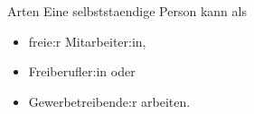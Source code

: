 
\begin{frame}{Arten}
  Eine selbststaendige Person kann als
  \begin{itemize}
  \item freie:r Mitarbeiter:in,
  \item Freiberufler:in oder 
  \item Gewerbetreibende:r arbeiten.
  \end{itemize}
\end{frame}

